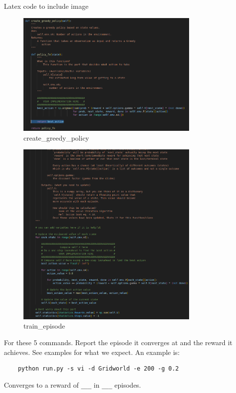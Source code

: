 \documentclass[a4paper]{article}
\theoremstyle{definition}
\begin{document}
Latex code to include image
\begin{figure}[H]
    \centering
    \includegraphics[width=0.8\textwidth]{images/2.greedy_policy.png}
    \caption{create\_greedy\_policy}
    \label{fig:greedy_policy}
\end{figure}

\begin{figure}[H]
    \centering
    \includegraphics[width=0.8\textwidth]{images/2.train_episode.png}
    \caption{train\_episode}
    \label{fig:train_episode}
\end{figure}

\vspace{5mm}
For these 5 commands. Report the episode it converges at and the reward it achieves. See examples for what we expect. An example is: \begin{verbatim}
    python run.py -s vi -d Gridworld -e 200 -g 0.2
\end{verbatim}
Converges to a reward of \verb|___| in \verb|___| episodes.
\end{document}
